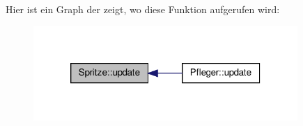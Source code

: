 Hier ist ein Graph der zeigt, wo diese Funktion aufgerufen wird\-:\nopagebreak
\begin{figure}[H]
\begin{center}
\leavevmode
\includegraphics[width=284pt]{class_spritze_aaf70068b9356284874156f19f5237c94_icgraph}
\end{center}
\end{figure}




